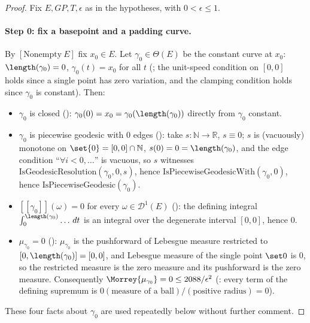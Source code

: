 \begin{proof}
  Fix $E,GP,T,\epsilon$ as in the hypotheses, with $0<\epsilon\le1$.

  \paragraph{Step 0: fix a basepoint and a padding curve.} By $[\mathrm{Nonempty}\ E]$ fix
  $x_0\in E$. Let $\gamma_0\in\Theta(E)$ be the constant curve at $x_0$: $\length(\gamma_0)=0$,
  $\gamma_0(t)=x_0$ for all $t$ (; the unit-speed condition on $[0,0]$ holds since a
  single point has zero variation, and the clamping condition holds since $\gamma_0$ is constant).
  Then:
  \begin{itemize}
    \item $\gamma_0$ is closed (): $\gamma_0(0)=x_0=\gamma_0(\length(\gamma_0))$
      directly from $\gamma_0$ constant.
    \item $\gamma_0$ is piecewise geodesic with $0$ edges (): take
      $s\colon\mathbb N\to\mathbb R$, $s\equiv0$; $s$ is (vacuously) monotone on
      $\set{0}=[0,0]\cap\mathbb N$, $s(0)=0=\length(\gamma_0)$, and the edge condition
      ``$\forall i<0,\dots$'' is vacuous, so $s$ witnesses
      $\mathrm{IsGeodesicResolution}(\gamma_0,0,s)$, hence $\mathrm{IsPiecewiseGeodesicWith}
      (\gamma_0,0)$, hence $\mathrm{IsPiecewiseGeodesic}(\gamma_0)$.
    \item $[[\gamma_0]](\omega)=0$ for every $\omega\in\mathcal D^1(E)$
      (): the defining integral $\int_0^{\length(\gamma_0)}\dots\,dt$ is an
      integral over the degenerate interval $[0,0]$, hence $0$.
    \item $\mu_{\gamma_0}=0$ (): $\mu_{\gamma_0}$ is the pushforward of
      Lebesgue measure restricted to $[0,\length(\gamma_0)]=[0,0]$, and Lebesgue measure of the
      single point $\set0$ is $0$, so the restricted measure is the zero measure and its
      pushforward is the zero measure. Consequently $\Morrey{\mu_{\gamma_0}}=0\le2088/\epsilon^2$
      (: every term of the defining supremum is $0(\text{measure of a
      ball})/(\text{positive radius})=0$).
  \end{itemize}
  These four facts about $\gamma_0$ are used repeatedly below without further comment.


\end{proof}
